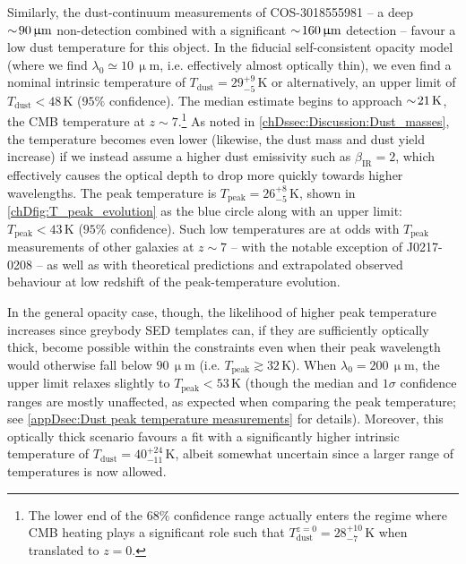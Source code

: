 Similarly, the dust-continuum measurements of COS-3018555981 -- a deep $\sim \! 90 \, \mathrm{\upmu m}$ non-detection combined with a significant $\sim \! 160 \, \mathrm{\upmu m}$ detection -- favour a low dust temperature for this object. In the fiducial self-consistent opacity model (where we find $\lambda_0 \simeq 10 \, \mathrm{\upmu m}$, i.e. effectively almost optically thin), we even find a nominal intrinsic temperature of $T_\text{dust} = 29_{-5}^{+9} \, \mathrm{K}$ or alternatively, an upper limit of $T_\text{dust} < 48 \, \mathrm{K}$ ($95 \%$ confidence). The median estimate begins to approach $\sim \! 21 \, \mathrm{K}$, the CMB temperature at $z \sim 7$.\footnote{The lower end of the $68\%$ confidence range actually enters the regime where CMB heating plays a significant role such that $T_\text{dust}^{z=0} = 28_{-7}^{+10} \, \mathrm{K}$ when translated to $z=0$.} As noted in \cref{chDssec:Discussion:Dust_masses}, the temperature becomes even lower (likewise, the dust mass and dust yield increase) if we instead assume a higher dust emissivity such as $\beta_\text{IR} = 2$, which effectively causes the optical depth to drop more quickly towards higher wavelengths. The peak temperature is $T_\text{peak} = 26_{-5}^{+8} \, \mathrm{K}$, shown in \cref{chDfig:T_peak_evolution} as the blue circle along with an upper limit: $T_\text{peak} < 43 \, \mathrm{K}$ ($95 \%$ confidence). Such low temperatures are at odds with $T_\text{peak}$ measurements of other galaxies at $z \sim 7$ -- with the notable exception of J0217-0208 \citep{2020ApJ...896...93H} -- as well as with theoretical predictions \citep[e.g.][]{2019MNRAS.489.1397L} and extrapolated observed behaviour at low redshift \citep{2018A&A...609A..30S} of the peak-temperature evolution.

In the general opacity case, though, the likelihood of higher peak temperature increases since greybody SED templates can, if they are sufficiently optically thick, become possible within the constraints even when their peak wavelength would otherwise fall below $90 \, \mathrm{\upmu m}$ (i.e. $T_\text{peak} \gtrsim 32 \, \mathrm{K}$). When $\lambda_0 = 200 \, \mathrm{\upmu m}$, the upper limit relaxes slightly to $T_\text{peak} < 53 \, \mathrm{K}$ (though the median and $1 \sigma$ confidence ranges are mostly unaffected, as expected when comparing the peak temperature; see \cref{appDsec:Dust peak temperature measurements} for details). Moreover, this optically thick scenario favours a fit with a significantly higher intrinsic temperature of $T_\text{dust} = 40_{-11}^{+24} \, \mathrm{K}$, albeit somewhat uncertain since a larger range of temperatures is now allowed.

